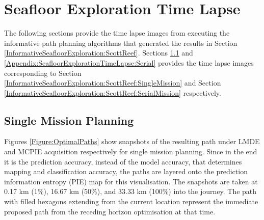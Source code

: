 \chapter{Seafloor Exploration Time Lapse}
\label{Appendix:SeafloorExplorationTimeLapse}

	The following sections provide the time lapse images from executing the informative path planning algorithms that generated the results in Section \ref{InformativeSeafloorExploration:ScottReef}. Sections \ref{Appendix:SeafloorExplorationTimeLapse:Single} and \ref{Appendix:SeafloorExplorationTimeLapse:Serial} provides the time lapse images corresponding to Section \ref{InformativeSeafloorExploration:ScottReef:SingleMission} and Section \ref{InformativeSeafloorExploration:ScottReef:SerialMission} respectively.
	
	\section{Single Mission Planning}
	\label{Appendix:SeafloorExplorationTimeLapse:Single}

			Figures \ref{Figure:OptimalPaths} show snapshots of the resulting path under LMDE and MCPIE acquisition respectively for single mission planning. Since in the end it is the prediction accuracy, instead of the model accuracy, that determines mapping and classification accuracy, the paths are layered onto the prediction information entropy (PIE) map for this visualisation. The snapshots are taken at 0.17 km (1\%), 16.67 km (50\%), and 33.33 km (100\%) into the journey. The path with filled hexagons extending from the current location represent the immediate proposed path from the receding horizon optimisation at that time.
				

